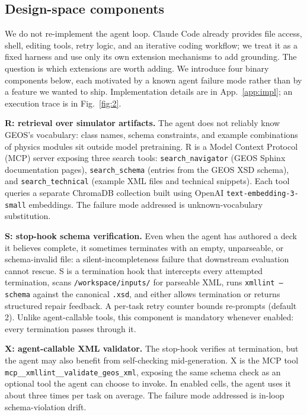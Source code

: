 \documentclass{article}
\begin{document}
\subsection{Design-space components}
\label{subsec:overview}

We do not re-implement the agent loop. Claude Code already provides file access, shell, editing tools, retry logic, and an iterative coding workflow; we treat it as a fixed harness and use only its own extension mechanisms to add grounding. The question is which extensions are worth adding. We introduce four binary components below, each motivated by a known agent failure mode rather than by a feature we wanted to ship. Implementation details are in App.~\ref{app:impl}; an execution trace is in Fig.~\ref{fig:2}.

\textbf{R: retrieval over simulator artifacts.} The agent does not reliably know GEOS's vocabulary: class names, schema constraints, and example combinations of physics modules sit outside model pretraining. R is a Model Context Protocol (MCP) server exposing three search tools: \texttt{search\_navigator} (GEOS Sphinx documentation pages), \texttt{search\_schema} (entries from the GEOS XSD schema), and \texttt{search\_technical} (example XML files and technical snippets). Each tool queries a separate ChromaDB collection built using OpenAI \texttt{text-embedding-3-small} embeddings. The failure mode addressed is unknown-vocabulary substitution.

\textbf{S: stop-hook schema verification.} Even when the agent has authored a deck it believes complete, it sometimes terminates with an empty, unparseable, or schema-invalid file: a silent-incompleteness failure that downstream evaluation cannot rescue. S is a termination hook that intercepts every attempted termination, scans \texttt{/workspace/inputs/} for parseable XML, runs \texttt{xmllint --schema} against the canonical \texttt{.xsd}, and either allows termination or returns structured repair feedback. A per-task retry counter bounds re-prompts (default 2). Unlike agent-callable tools, this component is mandatory whenever enabled: every termination passes through it.

\textbf{X: agent-callable XML validator.} The stop-hook verifies at termination, but the agent may also benefit from self-checking mid-generation. X is the MCP tool \texttt{mcp\_\_xmllint\_\_validate\_geos\_xml}, exposing the same schema check as an optional tool the agent can choose to invoke. In enabled cells, the agent uses it about three times per task on average. The failure mode addressed is in-loop schema-violation drift.
\end{document}

